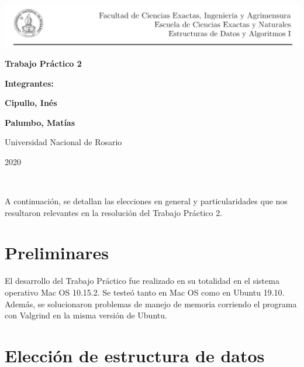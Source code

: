 \documentclass[11pt]{article}
\begin{document}
\begin{titlepage}
    \hspace{-1.2cm}\includegraphics[scale= 0.8]{header2}
    \begin{center}
        \vfill
        \vfill
            \vspace{0.7cm}
            \noindent\textbf{\Huge Trabajo Práctico 2}\par
            \vspace{.5cm}
        \vfill
        \noindent \textbf{\huge Integrantes:}\par
        \vspace{.5cm}
        \noindent \textbf{\Large Cipullo, Inés}\par
        \noindent \textbf{\Large Palumbo, Matías}\par
 
        \vfill
        \large Universidad Nacional de Rosario \par
        \noindent\large 2020
    \end{center}
 \end{titlepage}
 \ \par


 \noindent A continuación, se detallan las elecciones en general y particularidades que nos resultaron relevantes en la resolución del Trabajo Práctico 2.\par

 \section{Preliminares}
 
 El desarrollo del Trabajo Práctico fue realizado en su totalidad en el sistema operativo Mac OS 10.15.2. Se testeó tanto en Mac OS como en Ubuntu 19.10. Además, se solucionaron problemas de manejo de memoria corriendo el programa con Valgrind en la misma versión de Ubuntu. \par
 
 \section{Elección de estructura de datos}
 
\end{document}
